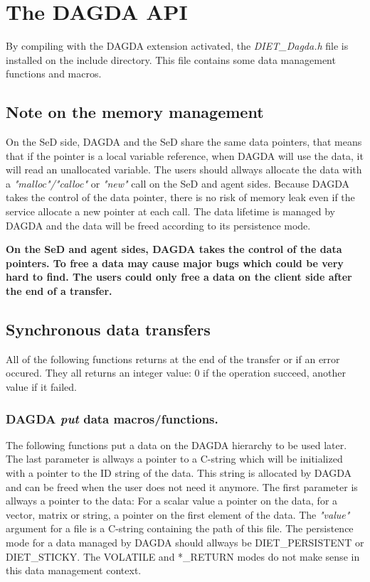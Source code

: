 \section{The DAGDA API}
By compiling \diet with the DAGDA extension activated, the
\textit{DIET\_Dagda.h} file is installed on the \diet include directory.
This file contains some data management functions and macros.
\subsection{Note on the memory management}
On the SeD side, DAGDA and the SeD share the
same data pointers, that means that if the pointer is a local variable
reference, when DAGDA will use the data, it will read an unallocated variable.
The users should allways allocate the data with a \textit{"malloc"/"calloc"} or
\textit{"new"} call on the SeD and agent sides. Because DAGDA takes the control
of the data pointer, there is no risk of memory leak even if the service
allocate a new pointer at each call. The data lifetime is managed by DAGDA
and the data will be freed according to its persistence mode.\\[4mm]
\begin{minipage}{2cm}
  \centering
  \textbf{{\Huge \Biohazard}}
\end{minipage}
\begin{minipage}{\textwidth - 2cm}
\textbf{On the SeD and agent sides, DAGDA takes the control of the data
pointers. To free a data may cause major bugs which could be very hard to
find. The users could only free a \diet data on the client side after the end of
a transfer.}
\end{minipage}
\subsection{Synchronous data transfers}
All of the following functions returns at the end of the transfer or
if an error occured. They all returns an integer value: 0 if the operation
succeed, another value if it failed.
\subsubsection{DAGDA \textit{put} data macros/functions.}
\label{sec:syncPutFunctions}
The following functions put a data on the DAGDA hierarchy to be used later.
The last parameter is allways a pointer to a C-string which will be
initialized with a pointer to the ID string of the data. This string is
allocated by DAGDA and can be freed when the user does not need it anymore.
The first parameter is allways a pointer to the data: For a scalar value
a pointer on the data, for a vector, matrix or string, a pointer on the
first element of the data. The \textit{"value"} argument for a file is
a C-string containing the path of this file. The persistence mode for
a data managed by DAGDA should allways be DIET\_PERSISTENT or DIET\_STICKY.
The VOLATILE and *\_RETURN modes do not make sense in this data management
context.

